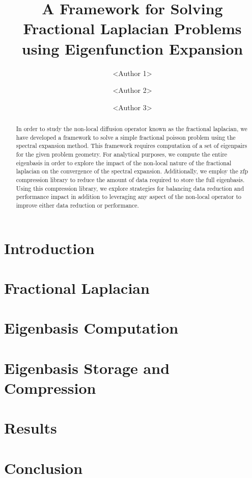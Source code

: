 \documentclass[sigconf]{acmart}
\begin{document}
	
	\title{A Framework for Solving Fractional Laplacian Problems using Eigenfunction Expansion}
	
	\author{<Author 1>}
	
	\author{<Author 2>}
	
	\author{<Author 3>}
	
	\begin{abstract}
		In order to study the non-local diffusion operator known as the fractional laplacian, we have developed a framework to solve a simple fractional poisson problem using the spectral expansion method. This framework requires computation of a set of eigenpairs for the given problem geometry. For analytical purposes, we compute the entire eigenbasis in order to explore the impact of the non-local nature of the fractional laplacian on the convergence of the spectral expansion. Additionally, we employ the zfp compression library to reduce the amount of data required to store the full eigenbasis. Using this compression library, we explore strategies for balancing data reduction and performance impact in addition to leveraging any aspect of the non-local operator to improve either data reduction or performance.
	\end{abstract}
	
	\maketitle
	
	\section{Introduction}
	
	
	\section{Fractional Laplacian}
	
	
	\section{Eigenbasis Computation}
	
	
	\section{Eigenbasis Storage and Compression}
	
	
	\section{Results}
	
	
	\section{Conclusion}
	
	
	
	
	
\end{document}

